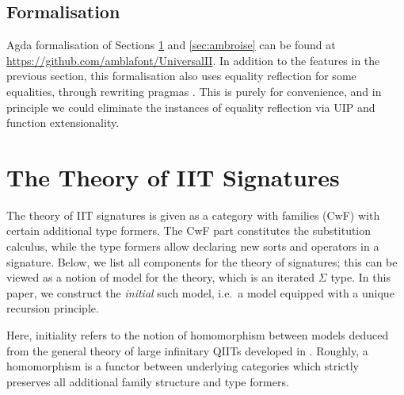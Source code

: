 \documentclass[a4paper,UKenglish,cleveref, autoref]{lipics-v2019}
\begin{document}
\subsection{Formalisation}

Agda formalisation of Sections \ref{sec:theory_of_signatures} and
\ref{sec:ambroise} can be found at
\url{https://github.com/amblafont/UniversalII}. In addition to the features in
the previous section, this formalisation also uses equality reflection for some
equalities, through rewriting pragmas \cite{cockxsprinkles}. This is purely for
convenience, and in principle we could eliminate the instances of equality
reflection via UIP and function extensionality.

\section{The Theory of IIT Signatures}
\label{sec:theory_of_signatures}

The theory of IIT signatures is given as a category with families
(CwF) \cite{Dybjer96internaltype} with certain additional type formers. The CwF
part constitutes the substitution calculus, while the type formers allow
declaring new sorts and operators in a signature. Below, we list all components
for the theory of signatures; this can be viewed as a notion of model for the
theory, which is an iterated $\Sigma$ type. In this paper, we construct the
\emph{initial} such model, i.e.\ a model equipped with a unique recursion principle.

Here, initiality refers to the notion of homomorphism between models deduced
from the general theory of large infinitary QIITs developed in \cite{large_inf_qiit}.
Roughly, a homomorphism is a functor between underlying
categories which strictly preserves all additional family structure and type
formers.
\end{document}

